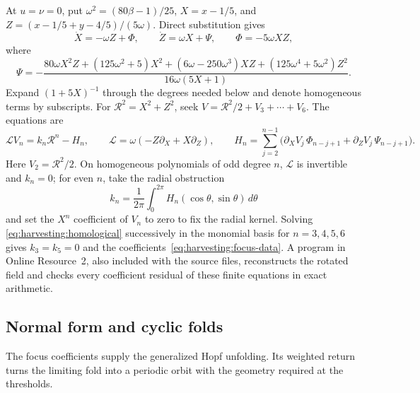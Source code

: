 At \(u=\nu=0\), put
\(\omega^2=(80\beta-1)/25\), \(X=x-1/5\), and
\(Z=(x-1/5+y-4/5)/(5\omega)\). Direct substitution gives
\begin{equation}\label{eq:harvesting:rotation}
 \dot X=-\omega Z+\Phi,\qquad
 \dot Z=\omega X+\Psi,\qquad \Phi=-5\omega XZ,
\end{equation}
where
\[
 \Psi=-\frac{
 80\omega X^2Z+(125\omega^2+5)X^2
 +(6\omega-250\omega^3)XZ
 +(125\omega^4+5\omega^2)Z^2}
 {16\omega(5X+1)}.
\]
Expand \((1+5X)^{-1}\) through the degrees needed below and denote
homogeneous terms by subscripts. For
\(\mathcal R^2=X^2+Z^2\), seek
\(V=\mathcal R^2/2+V_3+\cdots+V_6\). The equations are
\begin{equation}\label{eq:harvesting:homological}
 \mathcal L V_n=k_n\mathcal R^n-H_n,\qquad
 \mathcal L=\omega(-Z\partial_X+X\partial_Z),\qquad
 H_n=\sum_{j=2}^{n-1}
 \bigl(\partial_XV_j\,\Phi_{n-j+1}
       +\partial_ZV_j\,\Psi_{n-j+1}\bigr).
\end{equation}
Here \(V_2=\mathcal R^2/2\). On homogeneous polynomials of odd degree
\(n\), \(\mathcal L\) is invertible and \(k_n=0\); for even \(n\), take
the radial obstruction
\[
 k_n=\frac1{2\pi}\int_0^{2\pi}
 H_n(\cos\theta,\sin\theta)\,d\theta
\]
and set the \(X^n\) coefficient of \(V_n\) to zero to fix the radial
kernel. Solving \eqref{eq:harvesting:homological} successively in the
monomial basis for $n=3,4,5,6$ gives
$k_3=k_5=0$ and the coefficients~\eqref{eq:harvesting:focus-data}.
A program in Online Resource~2, also included with the source files,
reconstructs the rotated field and checks every coefficient residual of these
finite equations in exact arithmetic.

\subsection{Normal form and cyclic folds}

The focus coefficients supply the generalized Hopf unfolding. Its
weighted return turns the limiting fold into a periodic orbit with the
geometry required at the thresholds.

